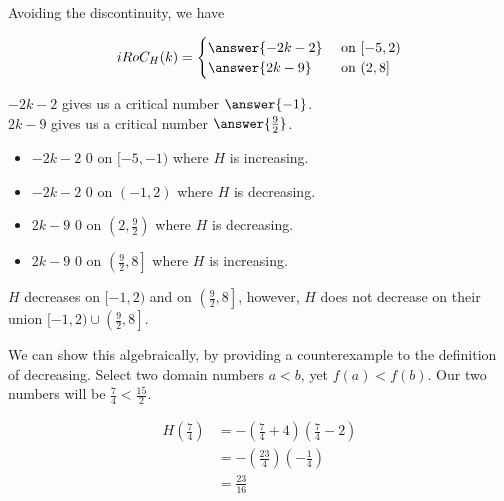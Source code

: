 \documentclass{ximera}
\begin{document}
\begin{exercise}
\begin{question}
Avoiding the discontinuity, we have

\[
iRoC_H(k) = 
\begin{cases}
  \answer{-2k - 2}   & \text{ on } [-5, 2)   \\
  \answer{2k - 9}     & \text{ on } (2, 8]  
\end{cases}
\]



$-2k - 2$ gives us a critical number $\answer{-1}$. \\


$2k - 9$ gives us a critical number $\answer{\frac{9}{2}}$. \\





\begin{itemize}
\item $-2k - 2$ \wordChoice{\choice{<} [correct]\choice{>}}  $0$ on  $[-5, -1)$ where $H$ is increasing.
\item $-2k - 2$ \wordChoice{\choice[correct]{<} \choice{>}}  $0$ on  $(-1, 2)$ where $H$ is decreasing.
\item $2k - 9$ \wordChoice{\choice[correct]{<} \choice{>}}  $0$ on  $\left( 2, \frac{9}{2} \right)$ where $H$ is decreasing.
\item $2k - 9$ \wordChoice{\choice{<} [correct]\choice{>}}  $0$ on  $\left( \frac{9}{2}, 8 \right]$ where $H$ is increasing.
\end{itemize}







\begin{warning}


$H$ decreases on $[-1, 2)$ and on $\left( \frac{9}{2}, 8 \right]$, however, $H$ does not decrease on their union $[-1, 2) \cup \left( \frac{9}{2}, 8 \right]$.



We can show this algebraically, by providing a counterexample to the definition of decreasing. Select two domain numbers $a < b$, yet $f(a) < f(b)$.  Our two numbers will be $\frac{7}{4} < \frac{15}{2}$.


\begin{align*}
H\left( \frac{7}{4} \right) & = -\left( \frac{7}{4} + 4 \right) \left( \frac{7}{4} - 2 \right) \\
& = -\left( \frac{23}{4} \right) \left( -\frac{1}{4} \right) \\
& = \frac{23}{16}  
\end{align*}



\end{warning}
\end{question}
\end{exercise}
\end{document}

